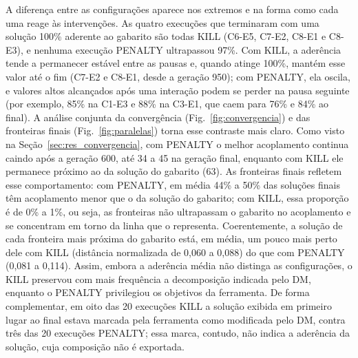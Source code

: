 \documentclass[conference]{IEEEtran}
\begin{document}
A diferença entre as configurações aparece nos extremos e na forma como cada uma reage às intervenções. As quatro execuções que terminaram com uma solução 100\% aderente ao gabarito são todas KILL (C6-E5, C7-E2, C8-E1 e C8-E3), e nenhuma execução PENALTY ultrapassou 97\%. Com KILL, a aderência tende a permanecer estável entre as pausas e, quando atinge 100\%, mantém esse valor até o fim (C7-E2 e C8-E1, desde a geração 950); com PENALTY, ela oscila, e valores altos alcançados após uma interação podem se perder na pausa seguinte (por exemplo, 85\% na C1-E3 e 88\% na C3-E1, que caem para 76\% e 84\% ao final).
A análise conjunta da convergência (Fig.~\ref{fig:convergencia}) e das fronteiras finais (Fig.~\ref{fig:paralelas}) torna esse contraste mais claro. Como visto na Seção~\ref{sec:res_convergencia}, com PENALTY o melhor acoplamento continua caindo após a geração 600, até 34 a 45 na geração final, enquanto com KILL ele permanece próximo ao da solução do gabarito (63). As fronteiras finais refletem esse comportamento: com PENALTY, em média 44\% a 50\% das soluções finais têm acoplamento menor que o da solução do gabarito; com KILL, essa proporção é de 0\% a 1\%, ou seja, as fronteiras não ultrapassam o gabarito no acoplamento e se concentram em torno da linha que o representa. Coerentemente, a solução de cada fronteira mais próxima do gabarito está, em média, um pouco mais perto dele com KILL (distância normalizada de 0,060 a 0,088) do que com PENALTY (0,081 a 0,114). Assim, embora a aderência média não distinga as configurações, o KILL preservou com mais frequência a decomposição indicada pelo DM, enquanto o PENALTY privilegiou os objetivos da ferramenta. De forma complementar, em oito das 20 execuções KILL a solução exibida em primeiro lugar ao final estava marcada pela ferramenta como modificada pelo DM, contra três das 20 execuções PENALTY; essa marca, contudo, não indica a aderência da solução, cuja composição não é exportada.
\end{document}
